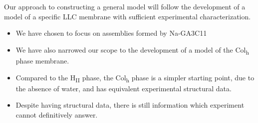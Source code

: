\documentclass{article}
\begin{document}
  Our approach to constructing a general model will follow the development of a
  model of a specific LLC membrane with sufficient experimental characterization.
    \begin{itemize}
	    \item We have chosen to focus on assemblies formed by Na-GA3C11
	    \item We have also narrowed our scope to the development of 
	    a model of the Col\textsubscript{h} phase membrane.
	    \item Compared to the H\textsubscript{II} phase, the Col\textsubscript{h}
	    phase is a simpler starting point, due to the absence of water, and has
	    equivalent experimental structural data.
	    \item Despite having structural data, there is still information which 
	    experiment cannot definitively answer.
    \end{itemize}



\end{document}
